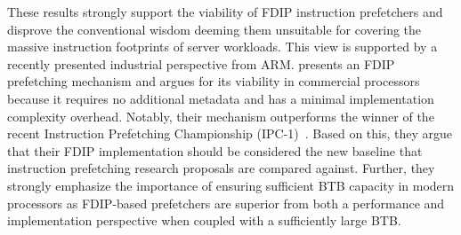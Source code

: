 \documentclass[../main.tex]{subfiles}
\begin{document}
\begin{refsection}
These results strongly support the viability of FDIP instruction
prefetchers and disprove the conventional wisdom deeming them
unsuitable for covering the massive instruction footprints of server
workloads. This view is supported by a recently presented industrial
perspective from ARM. \textcite{ishii21_re_fetch_direc_instr_prefet}
presents an FDIP prefetching mechanism and argues for its viability in
commercial processors because it requires no additional metadata and
has a minimal implementation complexity overhead. Notably, their
mechanism outperforms the winner of the recent Instruction Prefetching
Championship (IPC-1)~\cite{ipc1}. Based on this, they argue that their
FDIP implementation should be considered the new baseline that
instruction prefetching research proposals are compared
against. Further, they strongly emphasize the importance of ensuring
sufficient BTB capacity in modern processors as FDIP-based prefetchers
are superior from both a performance and implementation perspective
when coupled with a sufficiently large BTB.














\ifx\chapincluded\undefined
  \printbibliography
  \end{refsection}
 \fi
\end{document}
